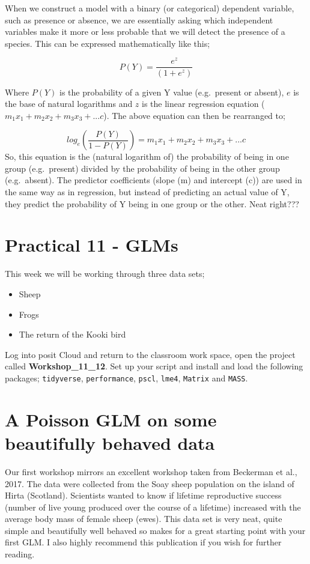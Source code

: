 \documentclass[
]{book}
\providecommand{\tightlist}{%
  \setlength{\itemsep}{0pt}\setlength{\parskip}{0pt}}
\begin{document}
When we construct a model with a binary (or categorical) dependent variable, such as presence or absence, we are essentially asking which independent variables make it more or less probable that we will detect the presence of a species. This can be expressed mathematically like this;

\[
P(Y) = \frac{e^z}{(1+e^z)}
\]

Where \(P(Y)\) is the probability of a given Y value (e.g.~present or absent), \(e\) is the base of natural logarithms and \(z\) is the linear regression equation (\(m_1x_1+m_2x_2+m_3x_3+...c\)). The above equation can then be rearranged to;

\[
log_e(\frac{P(Y)}{1-P(Y)}) = m_1x_1 + m_2x_2+m_3x_3 +... c
\]
So, this equation is the (natural logarithm of) the probability of being in one group (e.g.~present) divided by the probability of being in the other group (e.g.~absent). The predictor coefficients (slope (m) and intercept (c)) are used in the same way as in regression, but instead of predicting an actual value of Y, they predict the probability of Y being in one group or the other. Neat right???

\section{Practical 11 - GLMs}\label{practical-11---glms}

This week we will be working through three data sets;

\begin{itemize}
\tightlist
\item
  Sheep
\item
  Frogs
\item
  The return of the Kooki bird
\end{itemize}

Log into posit Cloud and return to the classroom work space, open the project called \textbf{Workshop\_11\_12}. Set up your script and install and load the following packages; \texttt{tidyverse}, \texttt{performance}, \texttt{pscl}, \texttt{lme4}, \texttt{Matrix} and \texttt{MASS}.

\section{A Poisson GLM on some beautifully behaved data}\label{a-poisson-glm-on-some-beautifully-behaved-data}

Our first workshop mirrors an excellent workshop taken from Beckerman et al., 2017. The data were collected from the Soay sheep population on the island of Hirta (Scotland). Scientists wanted to know if lifetime reproductive success (number of live young produced over the course of a lifetime) increased with the average body mass of female sheep (ewes). This data set is very neat, quite simple and beautifully well behaved so makes for a great starting point with your first GLM. I also highly recommend this publication if you wish for further reading.
\end{document}
